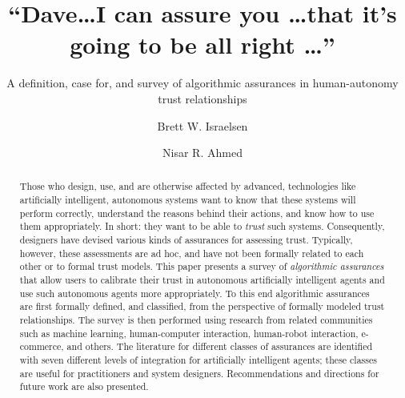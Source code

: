 \documentclass[format=manuscript, screen,review=true]{acmart}
\begin{document}
\title{``Dave\ldots I can assure you \ldots that it's going to be all right \ldots''} 
 \subtitle{A definition, case for, and survey of algorithmic assurances in human-autonomy trust relationships}
\author{Brett W. Israelsen}
\author{Nisar R. Ahmed}

\begin{abstract}
    Those who design, use, and are otherwise affected by advanced, technologies like artificially intelligent, autonomous systems want to know that these systems will perform correctly, understand the reasons behind their actions, and know how to use them appropriately. 
    In short: they want to be able to \emph{trust} such systems. Consequently, designers have devised various kinds of assurances for assessing trust.  
    Typically, however, these assessments are ad hoc, and have not been formally related to each other or to formal trust models.  This paper presents a survey of \emph{algorithmic assurances} that allow users to calibrate their trust in autonomous artificially intelligent agents and use such autonomous agents more appropriately. To this end algorithmic assurances are first formally defined, and classified, from the perspective of formally modeled trust relationships. The survey is then performed using research from related communities such as machine learning, human-computer interaction, human-robot interaction, e-commerce, and others. The literature for different classes of assurances are identified with seven different levels of integration for artificially intelligent agents; these classes are useful for practitioners and system designers. Recommendations and directions for future work are also presented.
\end{abstract}
\end{document}
